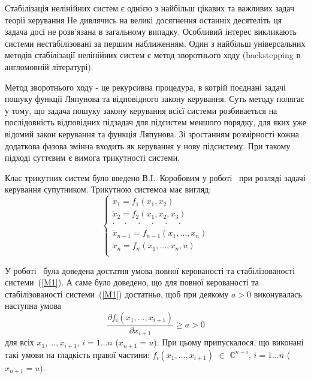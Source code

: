 \documentclass{article}
\begin{document}
Стабілізація нелінійних систем є однією з найбільш цікавих та важливих задач теорії керування
Не дивлячись на великі досягнення останніх десятеліть ця задача досі не розв'язана в 
загальному випадку. Особливий інтерес викликають системи нестабілізовані за першим
наближенням. Один з найбільш універсальних методів стабілізації нелінійних систем є метод зворотнього ходу 
(backstepping в англомовній літературі). 

Метод зворотнього ходу - це рекурсивна процедура, в котрій поєднані задачі пошуку функції Ляпунова та відповідного закону
керування. Суть методу полягає у тому, що задача пошуку закону керування всієї системи розбиваеться на послідовність
відповідних підзадач для підсистем меншого порядку, для яких уже відомий закон керування та функція Ляпунова.
Зі зростанням розмірності кожна додаткова фазова змінна входить як керування у нову підсистему. 
При такому підході суттєвим є вимога трикутності системи.

Клас трикутних систем було введено В.І.~Коробовим у роботі~\cite{?} при розляді задачі
керування супутником.
Трикутною системоа має вигляд: 
\begin{equation}\label{M1}
	\begin{cases}
        \dot x_1 = f_1(x_1, x_2)\\
        \dot x_2 = f_2(x_1, x_2 ,x_3)\\
        \cdot \quad \cdot \quad \cdot \quad \cdot \quad \cdot \quad \cdot \quad\\
        \dot x_{n-1} = f_{n-1}(x_1, \dots ,x_n)\\
        \dot x_{n} = f_{n}(x_1, \dots ,x_n,u)\\
	\end{cases}
\end{equation}

У роботі~\cite{?} була доведена достатня умова повної керованості та стабілізованості
системи~(\ref{M1}). А саме було доведено, що для повної керованості та стабілізованості
системи~(\ref{M1}) достатньо, щоб при деякому $a>0$ виконувалась наступна
умова 
\begin{equation}\label{M2}
    \frac{\partial f_i(x_1,\dots,x_{i+1})}{\partial x_{i+1}} \geq a > 0 
\end{equation} 
для всіх $x_1, \dots, x_{i+1}$, $i=1 \dots n $ ($x_{n+1} = u$). При цьому 
припускалося, що виконані такі умови на гладкість правої частини: 
$ f_i(x_1,\dots,x_{i+1})$ $\in$ $\mathbb{C}^{n-i}$, $i=1 \dots n $ ($x_{n+1} = u$).
\end{document}
